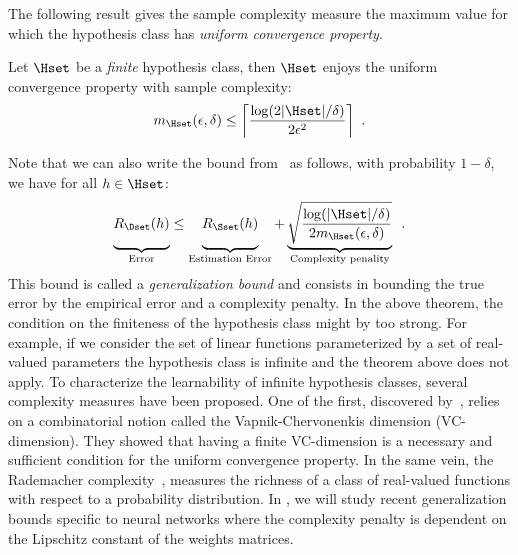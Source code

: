The following result gives the sample complexity measure the maximum value for which the hypothesis class has \emph{uniform convergence property}.
\begin{theorem} \label{theorem:ch2-sample_complexity_bound}
  Let $\Hset$ be a \emph{finite} hypothesis class, then $\Hset$ enjoys the uniform convergence property with sample complexity:
  \begin{equation}
      m_\Hset(\epsilon, \delta) \leq \left\lceil \frac{\log(2 |\Hset|	/ \delta)}{2 \epsilon^2} \right\rceil \enspace.
  \end{equation}
  \removespace
\end{theorem}
\noindent
Note that we can also write the bound from~ as follows, with probability $1 - \delta$, we have for all $h \in \Hset$:
\begin{equation}
  \underbrace{\vphantom{\sqrt{\frac{\log(|\Hset|/\delta)}{2 m_\Hset(\epsilon, \delta)}}} R_\Dset(h)}_{\text{Error}} \leq \underbrace{\vphantom{\sqrt{\frac{\log(|\Hset|/\delta)}{2 m_\Hset(\epsilon, \delta)}}} R_\Sset(h)}_{\text{Estimation Error}} + \underbrace{\sqrt{\frac{\log(|\Hset|/\delta)}{2 m_\Hset(\epsilon, \delta)}}}_{\text{Complexity penality}} \enspace.
\end{equation}
This bound is called a \emph{generalization bound} and consists in bounding the true error by the empirical error and a complexity penalty.
In the above theorem, the condition on the finiteness of the hypothesis class might by too strong.
For example, if we consider the set of linear functions parameterized by a set of real-valued parameters the hypothesis class is infinite and the theorem above does not apply.
To characterize the learnability of infinite hypothesis classes, several complexity measures have been proposed.
One of the first, discovered by~\citet{vapnik2015uniform}, relies on a combinatorial notion called the Vapnik-Chervonenkis dimension (VC-dimension). They showed that having a finite VC-dimension is a necessary and sufficient condition for the uniform convergence property.
In the same vein, the Rademacher complexity~\cite{koltchinskii2000rademacher}, measures the richness of a class of real-valued functions with respect to a probability distribution.
In , we will study recent generalization bounds specific to neural networks where the complexity penalty is dependent on the Lipschitz constant of the weights matrices.


